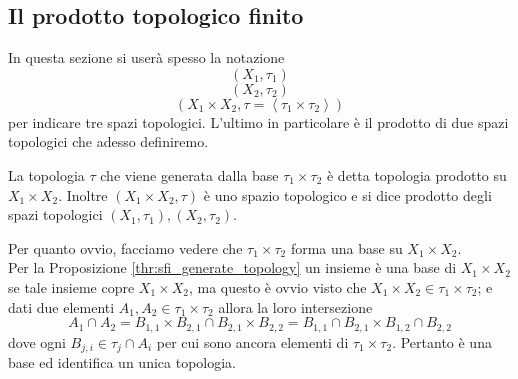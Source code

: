 \newpage



\subsection{\textcolor{TopGener}{\textbf{Il prodotto topologico finito}}}



In questa sezione si userà spesso la notazione 
\begin{equation*}
(X_1, \tau_1)
\end{equation*}
\begin{equation*}
(X_2, \tau_2)
\end{equation*}
\begin{equation*}
(X_1 \times X_2, \tau = \left\langle\tau_1 \times \tau_2 \right\rangle)
\end{equation*}
per indicare tre spazi topologici. L'ultimo in particolare è il prodotto di due spazi topologici che adesso definiremo.

\begin{definition}
	La topologia $\tau$ che viene generata dalla base $\tau_1 \times \tau_2$ è detta topologia prodotto su $X_1 \times X_2$. Inoltre $(X_1 \times X_2, \tau)$ è uno spazio topologico e si dice prodotto degli spazi topologici $(X_1, \tau_1), (X_2, \tau_2)$.
\end{definition}

\begin{remark}
	Per quanto ovvio, facciamo vedere che $\tau_1 \times \tau_2$ forma una base su $X_1 \times X_2$. \\ Per la Proposizione \ref{thr:sfi_generate_topology} un insieme è una base di $X_1 \times X_2$ se tale insieme copre $X_1 \times X_2$, ma questo è ovvio visto che $X_1 \times X_2 \in \tau_1 \times \tau_2$; e dati due elementi $A_1, A_2 \in \tau_1 \times \tau_2$ allora la loro intersezione 
	\begin{equation*}
	A_1 \cap A_2 = B_{1,1} \times B_{2,1} \cap B_{2,1} \times B_{2,2} = B_{1,1}\cap B_{2,1} \times B_{1,2} \cap B_{2,2}
	\end{equation*}
	dove ogni $B_{j,i} \in \tau_j \cap A_i$ per cui sono ancora elementi di $\tau_1 \times \tau_2$. Pertanto è una base ed identifica un unica topologia.
\end{remark}

